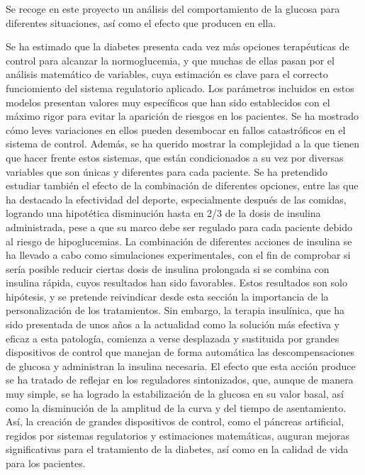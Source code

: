 
Se recoge en este proyecto un análisis del comportamiento de la glucosa para diferentes situaciones, así como el efecto que producen en ella. 

Se ha estimado que la diabetes presenta cada vez más opciones terapéuticas de control para alcanzar la normoglucemia, y que muchas de ellas pasan por el análisis matemático de variables, cuya estimación es clave para el correcto funciomiento del sistema regulatorio aplicado. Los parámetros incluidos en estos modelos presentan valores muy específicos que han sido establecidos con el máximo rigor para evitar la aparición de riesgos en los pacientes. Se ha mostrado cómo leves variaciones en ellos pueden desembocar en fallos catastróficos en el sistema de control. Además, se ha querido mostrar la complejidad a la que tienen que hacer frente estos sistemas, que están condicionados a su vez por diversas variables que son únicas y diferentes para cada paciente. Se ha pretendido estudiar también el efecto de la combinación de diferentes opciones, entre las que ha destacado la efectividad del deporte, especialmente después de las comidas, logrando una hipotética disminución hasta en 2/3 de la dosis de insulina administrada, pese a que su marco debe ser regulado para cada paciente debido al riesgo de hipoglucemias. La combinación de diferentes acciones de insulina se ha llevado a cabo como simulaciones experimentales, con el fin de comprobar si sería posible reducir ciertas dosis de insulina prolongada si se combina con insulina rápida, cuyos resultados han sido favorables. Estos resultados son solo hipótesis, y se pretende reivindicar desde esta sección la importancia de la personalización de los tratamientos. Sin embargo, la terapia insulínica, que ha sido presentada de unos años a la actualidad como la solución más efectiva y eficaz a esta patología, comienza a verse desplazada y sustituida por grandes dispositivos de control que manejan de forma automática las descompensaciones de glucosa y administran la insulina necesaria. El efecto que esta acción produce se ha tratado de reflejar en los reguladores sintonizados, que, aunque de manera muy simple, se ha logrado la estabilización de la glucosa en su valor basal, así como la disminución de la amplitud de la curva y del tiempo de asentamiento. 
Así, la creación de grandes dispositivos de control, como el páncreas artificial, regidos por sistemas regulatorios y estimaciones matemáticas, auguran mejoras significativas para el tratamiento de la diabetes, así como en la calidad de vida para los pacientes.


